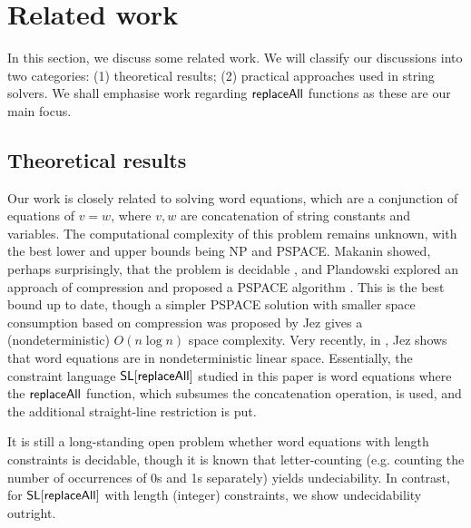 
\section{Related work}\label{sec-rel}

 
In this section, we discuss some related work. We will classify our discussions into two categories: (1) theoretical results; (2) practical approaches used in string solvers.  We shall emphasise work regarding $\mathsf{replaceAll}$ functions as these are our main focus. 

\subsection*{Theoretical results}
Our work is closely related to solving word equations, which are a conjunction of equations of $v=w$, where $v, w$ are concatenation of string constants and variables. The computational complexity of this problem remains unknown, with the best lower and upper bounds being NP and PSPACE. Makanin %
showed, perhaps surprisingly, that the problem is decidable \cite{Makanin}, and %
Plandowski explored an approach of compression and proposed a PSPACE algorithm \cite{P04}.  This is the best bound up to date, though a simpler PSPACE solution with smaller space consumption based on compression was proposed by Jez \cite{J16}  gives a (nondeterministic) $O(n \log n)$ space complexity. Very recently, in \cite{J17}, Jez shows that word equations are in nondeterministic linear space. 
Essentially, the constraint language  $\mathsf{SL}[\mathsf{replaceAll}]$ studied in this paper is word equations where the $\mathsf{replaceAll}$ function, which subsumes the concatenation operation, is used, and the additional straight-line restriction is put.  

It is still a long-standing open problem whether word equations with length constraints is decidable, though it is known that letter-counting (e.g. counting the number of occurrences of 0s and 1s separately) yields undeciability. In contrast, for  $\mathsf{SL}[\mathsf{replaceAll}]$ with length (integer) constraints, we show undecidability outright. 



